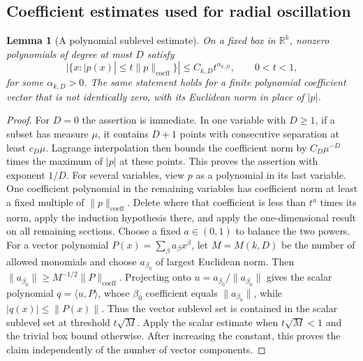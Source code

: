 \documentclass[11pt]{article}
\numberwithin{equation}{section}
\newtheorem{lemma}[theorem]{Lemma}
\theoremstyle{remark}
\theoremstyle{definition}
\newcommand{\R}{\mathbb R}
\begin{document}
\subsection{Coefficient estimates used for radial oscillation}
\begin{lemma}[A polynomial sublevel estimate]\label{mod:sublevel}
On a fixed box in $\R^k$, nonzero polynomials of degree at most $D$ satisfy
\[
 |\{x:|p(x)|\le t\|p\|_{\mathrm{coeff}}\}|
 \le C_{k,D}t^{\alpha_{k,D}},\qquad 0<t<1,
\]
for some $\alpha_{k,D}>0$. The same statement holds for a finite polynomial coefficient vector that
is not identically zero, with its Euclidean norm in place of $|p|$.
\end{lemma}
\begin{proof}
For $D=0$ the assertion is immediate. In one variable with $D\ge1$,
if a subset has measure $\mu$, it contains $D+1$ points
with consecutive separation at least $c_D\mu$. Lagrange interpolation
then bounds the coefficient norm by $C_D\mu^{-D}$ times the maximum of
$|p|$ at these points. This proves the assertion with exponent $1/D$.
For several variables, view $p$ as a polynomial in its last variable.
One coefficient polynomial in the remaining variables has coefficient
norm at least a fixed multiple of $\|p\|_{\mathrm{coeff}}$. Delete where
that coefficient is less than $t^a$ times its norm, apply the induction
hypothesis there, and apply the one-dimensional result on all remaining
sections. Choose a fixed $a\in(0,1)$ to balance the two powers.
For a vector polynomial $P(x)=\sum_\beta a_\beta x^\beta$, let $M=M(k,D)$
be the number of allowed monomials and choose $a_{\beta_0}$ of largest
Euclidean norm. Then
$\|a_{\beta_0}\|\ge M^{-1/2}\|P\|_{\mathrm{coeff}}$.
Projecting onto $u=a_{\beta_0}/\|a_{\beta_0}\|$ gives the scalar
polynomial $q=\langle u,P\rangle$, whose $\beta_0$ coefficient equals
$\|a_{\beta_0}\|$, while $|q(x)|\le\|P(x)\|$.
Thus the vector sublevel set is contained in the scalar sublevel set
at threshold $t\sqrt M$. Apply the scalar estimate when $t\sqrt M<1$
and the trivial box bound otherwise. After increasing the constant,
this proves the claim independently of the number of vector components.
\end{proof}
\end{document}
